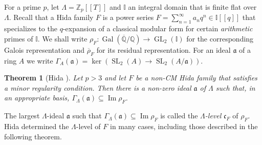 \documentclass[11pt]{amsart}
\newtheorem{thm}{Theorem}[section]
\theoremstyle{definition}
\theoremstyle{remark}
\DeclareMathOperator{\Frob}{Frob}
\DeclareMathOperator{\tr}{tr}
\def\Aa{\mathfrak{a}}
\def\cc{\mathfrak{c}}
\def\F{\mathbb{F}}
\def\I{\mathbb{I}}
\def\Q{\mathbb{Q}}
\def\Z{\mathbb{Z}}
\DeclareMathOperator{\Gal}{Gal}
\DeclareMathOperator{\GL}{GL}
\DeclareMathOperator{\im}{Im}
\DeclareMathOperator{\SL}{SL}
\begin{document}
%
%
%
For a prime $p$, let $\Lambda = \Z_p[[T]]$ and $\I$ an integral domain that is finite flat over $\Lambda$.  Recall that a Hida family $F$ is a power series $F = \sum_{n = 1}^\infty a_nq^n \in \I[[q]]$ that specializes to the $q$-expansion of a classical modular form for certain \textit{arithmetic} primes of $\I$.  We shall write $\rho_F : \Gal(\overline{\Q}/\Q) \to \GL_2(\I)$ for the corresponding Galois representation and $\overline{\rho}_F$ for its residual representation.  For an ideal $\Aa$ of a ring $A$ we write $\Gamma_A(\Aa) = \ker(\SL_2(A) \to \SL_2(A/\Aa))$.

\begin{thm}[Hida \cite{Hida15}]\label{HidaI}
Let $p > 3$ and let $F$ be a non-CM Hida family that satisfies a minor regularity condition.  Then there is a non-zero ideal $\Aa$ of $\Lambda$ such that, in an appropriate basis, $\Gamma_\Lambda(\Aa) \subseteq \im \rho_F$.  
\end{thm}

The largest $\Lambda$-ideal $\Aa$ such that $\Gamma_\Lambda(\Aa) \subseteq \im \rho_F$ is called the \textit{$\Lambda$-level} $\cc_F$ of $\rho_F$.  Hida determined the $\Lambda$-level of $F$ in many cases, including those described in the following theorem.
\end{document}
